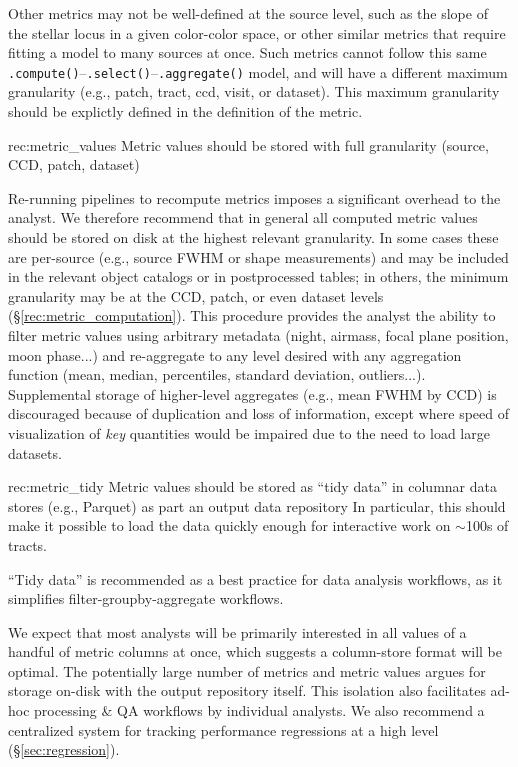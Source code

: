Other metrics may not be well-defined at the source level, such as the slope of the stellar locus in a given color-color space, or other similar metrics that require fitting a model to many sources at once.
Such metrics cannot follow this same \texttt{.compute()}--\texttt{.select()}--\texttt{.aggregate()} model, and will have a different maximum granularity (e.g., patch, tract, ccd, visit, or dataset).
This maximum granularity should be explictly defined in the definition of the metric.

\begin{recommendation}
    {rec:metric_values}
    {Metric values should be stored with full granularity (source, CCD, patch, dataset)}
\end{recommendation}

Re-running pipelines to recompute metrics imposes a significant overhead to the analyst.
We therefore recommend that in general all computed metric values should be stored on disk at the highest relevant granularity.
In some cases these are per-source (e.g., source FWHM or shape measurements) and may be included in the relevant object catalogs or in postprocessed tables; in others, the minimum granularity may be at the CCD, patch, or even dataset levels (\S \ref{rec:metric_computation}).
This procedure provides the analyst the ability to filter metric values using arbitrary metadata (night, airmass, focal plane position, moon phase...) and re-aggregate to any level desired with any aggregation function (mean, median, percentiles, standard deviation, outliers...).
Supplemental storage of higher-level aggregates (e.g., mean FWHM by CCD) is discouraged because of duplication and loss of information, except where speed of visualization of \emph{key} quantities would be impaired due to the need to load large datasets.


\begin{recommendation}
    {rec:metric_tidy}
    {Metric values should be stored as ``tidy data'' in columnar data stores (e.g., Parquet) as part an output data repository}
In particular, this should make it possible to load the data quickly enough for interactive work on $\sim$100s of tracts.
\end{recommendation}

``Tidy data'' \citep{JSSv059i10} is recommended as a best practice for data analysis workflows, as it simplifies filter-groupby-aggregate workflows.

We expect that most analysts will be primarily interested in all values of a handful of metric columns at once, which suggests a column-store format will be optimal.
The potentially large number of metrics and metric values argues for storage on-disk with the output repository itself.
This isolation also facilitates ad-hoc processing \& QA workflows by individual analysts.
We also recommend a centralized system for tracking performance regressions at a high level (\S \ref{sec:regression}).

